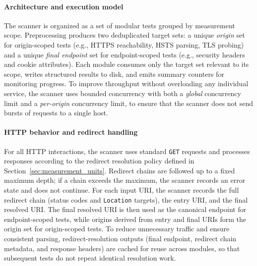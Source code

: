 \documentclass[a4paper,fleqn]{cas-sc}
\begin{document}
    \paragraph{Architecture and execution model}
    The scanner is organized as a set of modular tests grouped by measurement scope. Preprocessing produces two deduplicated target sets: a unique \emph{origin} set for origin-scoped tests (e.g., HTTPS reachability, HSTS parsing, TLS probing) and a unique \emph{final endpoint} set for endpoint-scoped tests (e.g., security headers and cookie attributes). 
    Each module consumes only the target set relevant to its scope, writes structured results to disk, and emits summary counters for monitoring progress. 
    To improve throughput without overloading any individual service, the scanner uses bounded concurrency with both a \emph{global} concurrency limit and a \emph{per-origin} concurrency limit, to ensure that the scanner does not send bursts of requests to a single host.

    \paragraph{HTTP behavior and redirect handling}
    For all HTTP interactions, the scanner uses standard \texttt{GET} requests and processes responses according to the redirect resolution policy defined in Section~\ref{sec:measurement_units}. 
    Redirect chains are followed up to a fixed maximum depth; if a chain exceeds the maximum, the scanner records an error state and does not continue. For each input URI, the scanner records the full redirect chain (status codes and \texttt{Location} targets), the entry URI, and the final resolved URI. 
    The final resolved URI is then used as the canonical endpoint for endpoint-scoped tests, while origins derived from entry and final URIs form the origin set for origin-scoped tests.
    To reduce unnecessary traffic and ensure consistent parsing, redirect-resolution outputs (final endpoint, redirect chain metadata, and response headers) are cached for reuse across modules, so that subsequent tests do not repeat identical resolution work.
\end{document}
